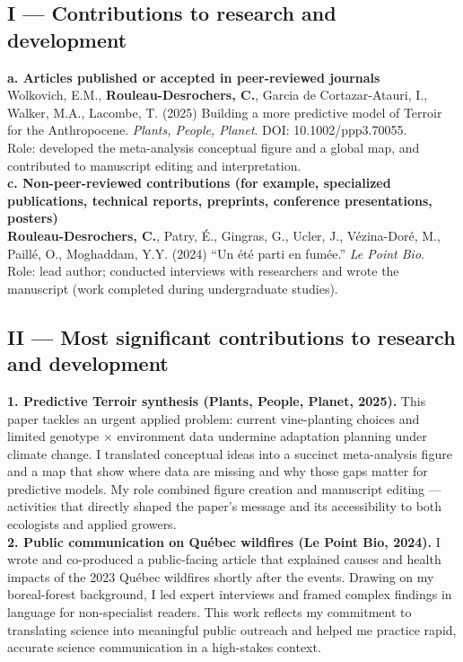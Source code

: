 \documentclass[12pt]{article}
\begin{document}
\subsection*{I --- Contributions to research and development}

\textbf{a. Articles published or accepted in peer-reviewed journals} \\[2pt]
Wolkovich, E.M., \textbf{Rouleau-Desrochers, C.}, Garcia de Cortazar-Atauri, I., Walker, M.A., Lacombe, T. (2025) Building a more predictive model of Terroir for the Anthropocene. \textit{Plants, People, Planet}. DOI: 10.1002/ppp3.70055.  \\
Role: developed the meta-analysis conceptual figure and a global map, and contributed to manuscript editing and interpretation. \\[6pt]

\textbf{c. Non-peer-reviewed contributions (for example, specialized publications, technical reports, preprints, conference presentations, posters)} \\[2pt]
\textbf{Rouleau-Desrochers, C.}, Patry, É., Gingras, G., Ucler, J., Vézina-Doré, M., Paillé, O., Moghaddam, Y.Y. (2024) ``Un été parti en fumée.'' \textit{Le Point Bio}.  \\
Role: lead author; conducted interviews with researchers and wrote the manuscript (work completed during undergraduate studies). \\

\subsection*{II --- Most significant contributions to research and development}

\textbf{1. Predictive Terroir synthesis (Plants, People, Planet, 2025).}  
This paper tackles an urgent applied problem: current vine-planting choices and limited genotype × environment data undermine adaptation planning under climate change. I translated conceptual ideas into a succinct meta-analysis figure and a map that show where data are missing and why those gaps matter for predictive models. My role combined figure creation and manuscript editing — activities that directly shaped the paper's message and its accessibility to both ecologists and applied growers. \\

\textbf{2. Public communication on Québec wildfires (Le Point Bio, 2024).}  
I wrote and co-produced a public-facing article that explained causes and health impacts of the 2023 Québec wildfires shortly after the events. Drawing on my boreal-forest background, I led expert interviews and framed complex findings in language for non-specialist readers. This work reflects my commitment to translating science into meaningful public outreach and helped me practice rapid, accurate science communication in a high-stakes context.
\end{document}
